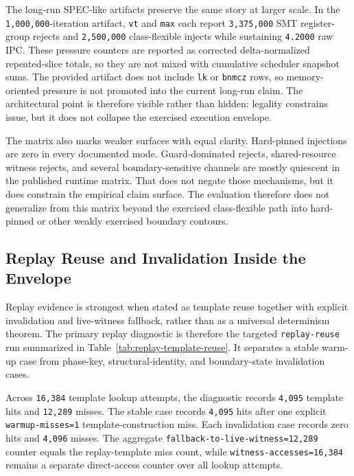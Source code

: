 \documentclass[twocolumn]{article}
\begin{document}
The long-run SPEC-like artifacts preserve the same story at larger scale. In the \texttt{1,000,000}-iteration artifact, \texttt{vt} and \texttt{max} each report \texttt{3,375,000} SMT register-group rejects and \texttt{2,500,000} class-flexible injects while sustaining \texttt{4.2000} raw IPC. These pressure counters are reported as corrected delta-normalized repeated-slice totals, so they are not mixed with cumulative scheduler snapshot sums. The provided artifact does not include \texttt{lk} or \texttt{bnmcz} rows, so memory-oriented pressure is not promoted into the current long-run claim. The architectural point is therefore visible rather than hidden: legality constrains issue, but it does not collapse the exercised execution envelope.

The matrix also marks weaker surfaces with equal clarity. Hard-pinned injections are zero in every documented mode. Guard-dominated rejects, shared-resource witness rejects, and several boundary-sensitive channels are mostly quiescent in the published runtime matrix. That does not negate those mechanisms, but it does constrain the empirical claim surface. The evaluation therefore does not generalize from this matrix beyond the exercised class-flexible path into hard-pinned or other weakly exercised boundary contours.


\subsection{Replay Reuse and Invalidation Inside the Envelope}

Replay evidence is strongest when stated as template reuse together with explicit invalidation and live-witness fallback, rather than as a universal determinism theorem. The primary replay diagnostic is therefore the targeted \texttt{replay-reuse} run summarized in Table~\ref{tab:replay-template-reuse}. It separates a stable warm-up case from phase-key, structural-identity, and boundary-state invalidation cases.



Across \texttt{16,384} template lookup attempts, the diagnostic records \texttt{4,095} template hits and \texttt{12,289} misses. The stable case records \texttt{4,095} hits after one explicit \texttt{warmup-misses=1} template-construction miss. Each invalidation case records zero hits and \texttt{4,096} misses. The aggregate \texttt{fallback-to-live-witness=12,289} counter equals the replay-template miss count, while \texttt{witness-accesses=16,384} remains a separate direct-access counter over all lookup attempts.
\end{document}
